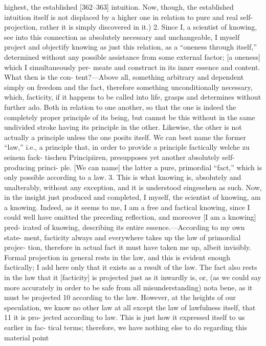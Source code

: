 highest, the established [362–363] intuition. Now, though, the established
intuition itself is not displaced by a higher one in relation to pure and real self-
projection, rather it is simply discovered in it.)
2. Since I, a scientist of knowing, see into this connection as absolutely
necessary and unchangeable, I myself project and objectify knowing as just
this relation, as a “oneness through itself,” determined without any possible
assistance from some external factor; [a oneness] which I simultaneously per-
meate and construct in its inner essence and content. What then is the con-
tent?—Above all, something arbitrary and dependent simply on freedom and
the fact, therefore something unconditionally necessary, which, facticity, if it
happens to be called into life, grasps and determines without further ado.
Both in relation to one another, so that the one is indeed the completely
proper principle of its being, but cannot be this without in the same undivided
stroke having its principle in the other. Likewise, the other is not actually a
principle unless the one posits itself. We can best name the former “law,” i.e.,
a principle that, in order to provide a principle factically {welche zu seinem fack-
tischen Principiiren}, presupposes yet another absolutely self-producing princi-
ple. [We can name] the latter a pure, primordial “fact,” which is only possible
according to a law.
3. This is what knowing is, absolutely and unalterably, without any
exception, and it is understood {eingesehen} as such. Now, in the insight just
produced and completed, I myself, the scientist of knowing, am a knowing.
Indeed, as it seems to me, I am a free and factical knowing, since I could well
have omitted the preceding reflection, and moreover [I am a knowing] pred-
icated of knowing, describing its entire essence.—According to my own state-
ment, facticity always and everywhere takes up the law of primordial projec-
tion, therefore in actual fact it must have taken me up, albeit invisibly. Formal
projection in general rests in the law, and this is evident enough factically; I
add here only that it exists as a result of the law. The fact also rests in the law
that it [facticity] is projected just as it inwardly is, or, (as we could say more
accurately in order to be safe from all misunderstanding) nota bene, as it must
be projected 10 according to the law. However, at the heights of our speculation,
we know no other law at all except the law of lawfulness itself, that 11 it is pro-
jected according to law. This is just how it expressed itself to us earlier in fac-
tical terms; therefore, we have nothing else to do regarding this material point
